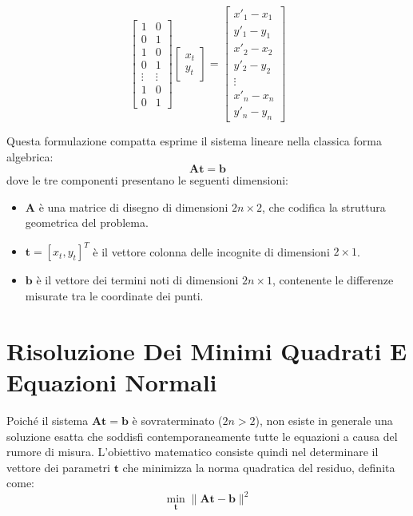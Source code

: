 ﻿\documentclass[11pt, a4paper]{article}
\begin{document}
\[
\begin{bmatrix}
1 & 0 \\
0 & 1 \\
1 & 0 \\
0 & 1 \\
\vdots & \vdots \\
1 & 0 \\
0 & 1
\end{bmatrix}
\begin{bmatrix}
x_t \\
y_t
\end{bmatrix}
=
\begin{bmatrix}
x'_1 - x_1 \\
y'_1 - y_1 \\
x'_2 - x_2 \\
y'_2 - y_2 \\
\vdots \\
x'_n - x_n \\
y'_n - y_n
\end{bmatrix}
\]

Questa formulazione compatta esprime il sistema lineare nella classica forma algebrica:
\[
\bm{A}\bm{t} = \bm{b}
\]
dove le tre componenti presentano le seguenti dimensioni:
\begin{itemize}[noitemsep]
    \item $\bm{A}$ è una matrice di disegno di dimensioni $2n \times 2$, che codifica la struttura geometrica del problema.
    \item $\bm{t} = [x_t, y_t]^T$ è il vettore colonna delle incognite di dimensioni $2 \times 1$.
    \item $\bm{b}$ è il vettore dei termini noti di dimensioni $2n \times 1$, contenente le differenze misurate tra le coordinate dei punti.
\end{itemize}

\newpage

\section{Risoluzione Dei Minimi Quadrati E Equazioni Normali}

Poiché il sistema $\bm{A}\bm{t} = \bm{b}$ è sovraterminato ($2n > 2$), non esiste in generale una soluzione esatta che soddisfi contemporaneamente tutte le equazioni a causa del rumore di misura. L'obiettivo matematico consiste quindi nel determinare il vettore dei parametri $\bm{t}$ che minimizza la norma quadratica del residuo, definita come:
\[
\min_{\bm{t}} \lVert\bm{A}\bm{t} - \bm{b}\rVert^2
\]
\end{document}
